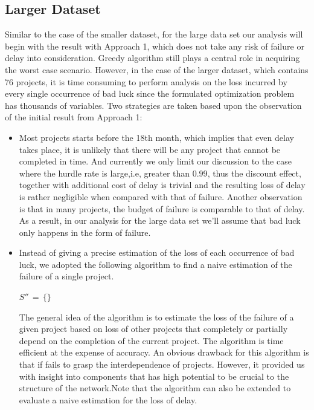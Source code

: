 \documentclass[final,3p,times]{elsarticle}
\begin{document}
\subsection{Larger Dataset}
Similar to the case of the smaller dataset, for the large data set our analysis will begin with the result with Approach 1, which does not take any risk of failure or delay into consideration. Greedy algorithm still plays a central role in acquiring the worst case scenario. However, in the case of the larger dataset, which contains 76 projects, it is time consuming to perform analysis on the loss incurred by every single occurrence of bad luck since the formulated optimization problem has thousands of variables. Two strategies are taken based upon the observation of the initial result from Approach 1:
\begin{itemize}
\item Most projects starts before the 18th month, which implies that even delay takes place, it is unlikely that there will be any project that cannot be completed in time. And currently we only limit our discussion to the case where the hurdle rate is large,i.e, greater than $0.99$, thus the discount effect, together with additional cost of delay is trivial and the resulting loss of delay is rather negligible when compared with that of failure. Another observation is that in many projects, the budget of failure is comparable to that of delay. As a result, in our analysis for the large data set we'll assume that bad luck only happens in the form of failure.
\item Instead of giving a precise estimation of the loss of each occurrence of bad luck, we adopted the following algorithm to find a naive estimation of the failure of a single project.

\begin{algorithm}
$S''\,=\,\{\}$\;
\end{algorithm}

The general idea of the algorithm is to estimate the loss of the failure of a given project based on loss of other projects that completely or partially depend on the completion of the current project. The algorithm is time efficient at the expense of accuracy. An obvious drawback for this algorithm is that if fails to grasp the interdependence of projects. However, it provided us with insight into components that has high potential to be crucial to the structure of the network.Note that the algorithm can also be extended to evaluate a naive estimation for the loss of delay.
\end{itemize}
\end{document}
